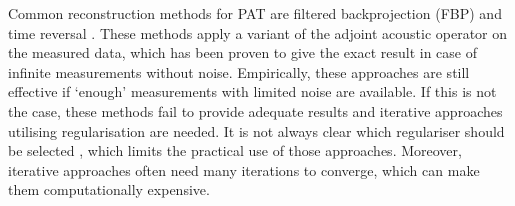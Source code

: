 \documentclass[journal]{IEEEtran}
\begin{document}
Common reconstruction methods for PAT are filtered backprojection (FBP) \cite{Kruger1995, Finch2004, Willemink2010, Haltmeier2014} and time reversal \cite{Burgholzer2007, Treeby2010}. These methods apply a variant of the adjoint acoustic operator on the measured data, which has been proven to give the exact result in case of infinite measurements without noise. Empirically, these approaches are still effective if `enough' measurements with limited noise are available. If this is not the case, these methods fail to provide adequate results and iterative approaches utilising regularisation \cite{Dean-Ben2012a, Huang2013, Arridge2016a, Arridge2016b, Boink2018, Nguyen2018, Frikel2018} are needed. It is not always clear which regulariser should be selected \cite{Boink2018}, which limits the practical use of those approaches. Moreover, iterative approaches often need many iterations to converge, which can make them computationally expensive.
\end{document}
